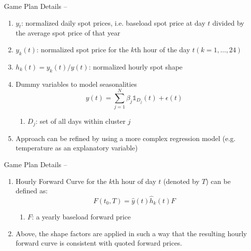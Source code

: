 \documentclass{beamer}
\begin{document}
\begin{frame}{Game Plan Details -- \cite{BurgerGraeberSchindlmayr-2014}}
    \begin{enumerate}[label=$\bullet$, itemsep=0.1cm]
        \item $y_t$: normalized daily spot prices, i.e. baseload spot price at day $t$ divided by the average spot price of that year

        \item $y_k(t)$: normalized spot price for the $k$th hour of the day $t (k = 1, \ldots, 24)$

        \item $h_k(t) = y_k(t) / y(t)$: normalized hourly spot shape

        \item Dummy variables to model seasonalities
              \[
                  y(t)
                  = \sum_{j = 1}^N \beta_j \mathds{1}_{D_j}(t) + \epsilon(t)
              \]
              \begin{enumerate}
                  \item $D_j$: set of all days within cluster $j$
              \end{enumerate}

        \item Approach can be refined by using a more complex regression model (e.g. temperature as an explanatory variable)
    \end{enumerate}
\end{frame}


\begin{frame}{Game Plan Details -- \cite{BurgerGraeberSchindlmayr-2014}}
    \begin{enumerate}[label=--]
        \item Hourly Forward Curve for the $k$th hour of day $t$ (denoted by $T$) can be defined as:
              \[
                  F(t_0, T) = \hat y(t) \hat h_k(t) F
              \]
              \begin{enumerate}[label=$\bullet$]
                  \item $F$: a yearly baseload forward price
              \end{enumerate}

        \item Above, the shape factors are applied in such a way that the resulting hourly forward curve is consistent with quoted forward prices.
    \end{enumerate}
\end{frame}
\end{document}
